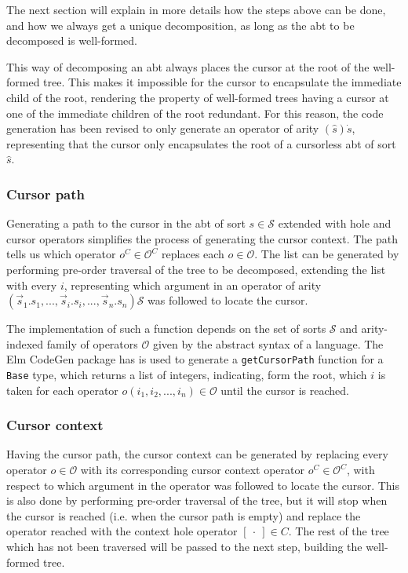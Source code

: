 \documentclass[sigplan,review]{acmart}
\newcommand{\abt}{\textsf{abt}\xspace}
\begin{document}
The next section will explain in more details how the steps above can be done,
and how we always get a unique decomposition, as long as the \abt to be decomposed is well-formed.

This way of decomposing an \abt always places the cursor at the root of the
well-formed tree. This makes it impossible for the cursor to encapsulate the immediate
child of the root, rendering the property of well-formed trees having a cursor at one of the immediate children of the root redundant. For this reason, the code generation
has been revised to only generate an operator of arity $(\hat{s})\dot{s}$,
representing that the cursor only encapsulates the root of a cursorless \abt
of sort $\hat{s}$.

\subsubsection{Cursor path}

Generating a path to the cursor in the \abt of sort $s \in \mathcal{S}$ extended with
hole and cursor operators simplifies the process of generating the cursor context. The path tells us
which operator $o^C \in \mathcal{O}^C$ replaces each $o \in \mathcal{O}$.
The list can be generated by performing pre-order traversal of the tree to be decomposed,
extending the list with every $i$, representing which argument in an operator of
arity $(\vec{s}_1.s_1, ... , \vec{s}_i.s_i, ..., \vec{s}_n.s_n)\mathcal{S}$ was
followed to locate the cursor.

The implementation of such a function depends on the set of sorts $\mathcal{S}$
and arity-indexed family of operators $\mathcal{O}$ given by the abstract syntax
of a language. The Elm CodeGen package\cite{elm-codegen-package} has is used to
generate a \texttt{getCursorPath} function for a \texttt{Base} type, which returns a list of integers, indicating, form the root, which $i$ is taken for each operator $o(i_1,i_2,...,i_n) \in \mathcal{O}$ until the cursor is reached.

\subsubsection{Cursor context}

Having the cursor path, the cursor context can be generated by replacing every
operator $o \in \mathcal{O}$ with its corresponding cursor context operator
$o^C \in \mathcal{O}^C$, with respect to which argument in the operator was
followed to locate the cursor. This is also done by performing pre-order traversal
of the tree, but it will stop when the cursor is reached (i.e. when the
cursor path is empty) and replace the operator reached with the
context hole operator $[ \ \cdot \ ] \in C$. The rest of the tree which has not
been traversed will be passed to the next step, building the well-formed tree.
\end{document}
